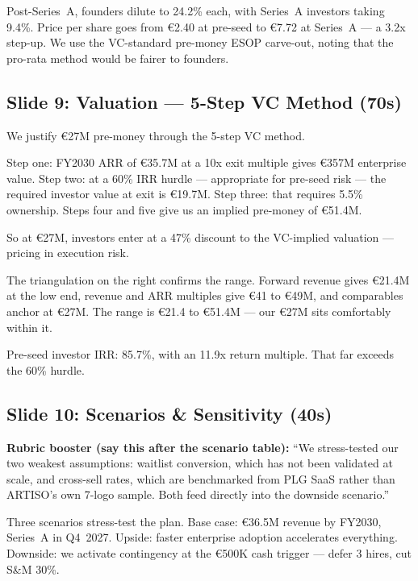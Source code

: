 \documentclass[11pt,a4paper]{article}
\begin{document}
Post-Series~A, founders dilute to 24.2\% each, with Series~A investors taking 9.4\%. Price per share goes from \euro{}2.40 at pre-seed to \euro{}7.72 at Series~A --- a 3.2x step-up. We use the VC-standard pre-money ESOP carve-out, noting that the pro-rata method would be fairer to founders.

\subsection{Slide 9: Valuation --- 5-Step VC Method (\texttildelow70s)}

We justify \euro{}27M pre-money through the 5-step VC method.

Step one: FY2030 ARR of \euro{}35.7M at a 10x exit multiple gives \euro{}357M enterprise value. Step two: at a 60\% IRR hurdle --- appropriate for pre-seed risk --- the required investor value at exit is \euro{}19.7M. Step three: that requires 5.5\% ownership. Steps four and five give us an implied pre-money of \euro{}51.4M.

So at \euro{}27M, investors enter at a 47\% discount to the VC-implied valuation --- pricing in execution risk.

The triangulation on the right confirms the range. Forward revenue gives \euro{}21.4M at the low end, revenue and ARR multiples give \euro{}41 to \euro{}49M, and comparables anchor at \euro{}27M. The range is \euro{}21.4 to \euro{}51.4M --- our \euro{}27M sits comfortably within it.

Pre-seed investor IRR: 85.7\%, with an 11.9x return multiple. That far exceeds the 60\% hurdle.

\subsection{Slide 10: Scenarios \& Sensitivity (\texttildelow40s)}

\colorbox{artiso!10}{\parbox{\dimexpr\textwidth-2\fboxsep}{%
\small\color{artiso}\textbf{Rubric booster (say this after the scenario table):} ``We stress-tested our two weakest assumptions: waitlist conversion, which has not been validated at scale, and cross-sell rates, which are benchmarked from PLG SaaS rather than ARTISO's own 7-logo sample. Both feed directly into the downside scenario.''
}}\vspace{4pt}

Three scenarios stress-test the plan. Base case: \euro{}36.5M revenue by FY2030, Series~A in Q4~2027. Upside: faster enterprise adoption accelerates everything. Downside: we activate contingency at the \euro{}500K cash trigger --- defer 3 hires, cut S\&M 30\%.
\end{document}
